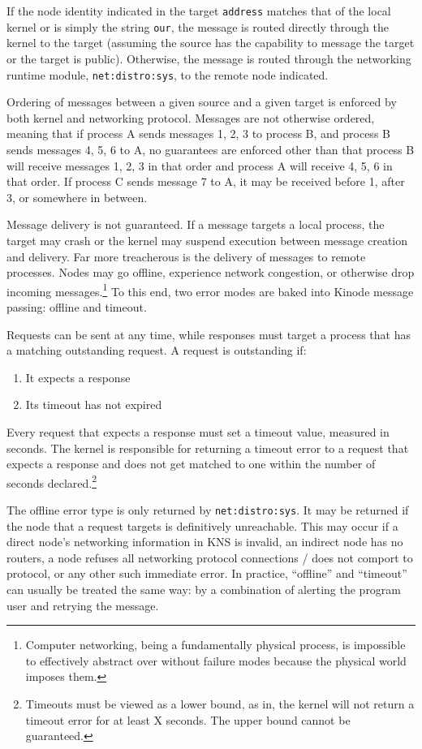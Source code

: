 \documentclass[runningheads]{llncs}
\begin{document}
If the node identity indicated in the target \verb|address| matches that of the local kernel or is simply the string \verb|our|, the message is routed directly through the kernel to the target (assuming the source has the capability to message the target or the target is public).
Otherwise, the message is routed through the networking runtime module, \verb|net:distro:sys|, to the remote node indicated.

Ordering of messages between a given source and a given target is enforced by both kernel and networking protocol.
Messages are not otherwise ordered, meaning that if process A sends messages 1, 2, 3 to process B, and process B sends messages 4, 5, 6 to A, no guarantees are enforced other than that process B will receive messages 1, 2, 3 in that order and process A will receive 4, 5, 6 in that order.
If process C sends message 7 to A, it may be received before 1, after 3, or somewhere in between.

Message delivery is not guaranteed.
If a message targets a local process, the target may crash or the kernel may suspend execution between message creation and delivery.
Far more treacherous is the delivery of messages to remote processes.
Nodes may go offline, experience network congestion, or otherwise drop incoming messages.\footnote{Computer networking, being a fundamentally physical process, is impossible to effectively abstract over without failure modes because the physical world imposes them.}
To this end, two error modes are baked into Kinode message passing: offline and timeout.

Requests can be sent at any time, while responses must target a process that has a matching outstanding request.
A request is outstanding if:
\begin{enumerate}
    \item It expects a response
    \item Its timeout has not expired
\end{enumerate}
Every request that expects a response must set a timeout value, measured in seconds.
The kernel is responsible for returning a timeout error to a request that expects a response and does not get matched to one within the number of seconds declared.\footnote{Timeouts must be viewed as a lower bound, as in, the kernel will not return a timeout error for at least X seconds. The upper bound cannot be guaranteed.}

The offline error type is only returned by \verb|net:distro:sys|.
It may be returned if the node that a request targets is definitively unreachable.
This may occur if a direct node's networking information in KNS is invalid, an indirect node has no routers, a node refuses all networking protocol connections / does not comport to protocol, or any other such immediate error.
In practice, ``offline'' and ``timeout'' can usually be treated the same way: by a combination of alerting the program user and retrying the message.
\end{document}
